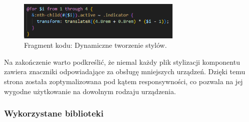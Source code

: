 \documentclass[12pt,a4paper]{article}
\begin{document}
\vspace{0.5cm}
\begin{figure}[h!]
    \centering
    \includegraphics[width=0.7\textwidth]{images/ex_loop_scss.png}
    \caption{Fragment kodu: Dynamiczne tworzenie stylów.}
\end{figure}
\vspace{0.5cm}

\noindent
Na zakończenie warto podkreślić, że niemal każdy plik stylizacji komponentu zawiera znaczniki odpowiadające za obsługę mniejszych urządzeń. Dzięki temu strona została zoptymalizowana pod kątem responsywności, co pozwala na jej wygodne użytkowanie na dowolnym rodzaju urządzenia.

\newpage

\subsubsection{Wykorzystane biblioteki}
\end{document}
